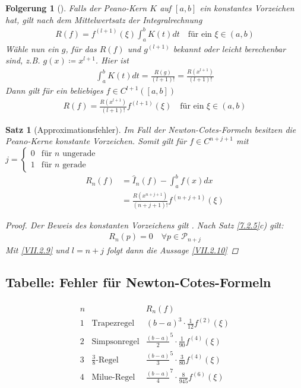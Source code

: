 \documentclass[ngerman,fontsize=11pt, paper=a4, parskip=half, titlepage=true, toc=bib]{scrbook}
\theoremstyle{definition}
\theoremstyle{plain}
\newtheorem{Satz}[Def]{Satz}		%
\newtheorem{Fol}[Def]{Folgerung}
\newcommand{\subsectione}[1]{\addtocounter{Def}{1}\subsection{#1}}
\newenvironment{Satze}[1][]{ %
  \begin{Satz}[#1]  }
  { \end{Satz}
  \addtocounter{subsection}{1}}
\newenvironment{Fole}[1][]{ %
  \begin{Fol}[#1]}
  {\end{Fol}
  \addtocounter{subsection}{1}}
\begin{document}
\begin{Fole}\label{7.2.7}
  Falls der Peano-Kern $K$ auf $[a,b]$ ein konstantes Vorzeichen hat,
gilt nach dem Mittelwertsatz der Integralrechnung
\begin{gather}
  R(f) = f^{(l+1)}(\xi) \int_a^b K(t)dt 
  \quad \text{für ein }\xi\in (a,b)
  \label{VII.2.8}
\end{gather}
Wähle nun ein $g$, für das $R(f)$ und $g^{(l+1)}$ bekannt oder leicht
berechenbar sind, z.B.
$g(x)\coloneqq x^{l+1}$. Hier ist
\begin{gather*}
  \int_a^bK(t)dt = \frac{R(g)}{(l+1)!} = \frac{R(x^{l+1})}{(l+1)!}
\end{gather*}
Dann gilt für ein beliebiges $f\in C^{l+1}([a,b])$
\begin{gather}
  R(f) = \frac{R(x^{l+1})}{(l+1)!} f^{(l+1)}(\xi)
  \quad \text{für ein }\xi \in (a,b)
\label{VII.2.9}
\end{gather}
\end{Fole}

\begin{Satze}[Approximationsfehler]
  Im Fall der Newton-Cotes-Formeln besitzen die Peano-Kerne
konstante Vorzeichen. Somit gilt für $f\in C^{n+j+1}$ mit 
  $j= \begin{cases}
    0 & \text{für $n$ ungerade}\\
    1 & \text{für $n$ gerade}
    \end{cases}$
\begin{align}\nonumber
  R_n(f) &= \hat{I}_n (f) - \int_a^b f(x) dx\\
         &= \frac{R(x^{n+j+1})}{(n+j+1)!}f^{(n+j+1)}(\xi)
           \label{VII.2.10}
\end{align}

\begin{proof}
  Der Beweis des konstanten Vorzeichens gilt
  \cite[siehe][]{steffensen}.
  Nach Satz \ref{7.2.5}c) gilt:
\begin{gather*}
  R_n(p) = 0 \quad\forall p\in\mathcal{P}_{n+j}
\end{gather*}
Mit \eqref{VII.2.9} und $l=n+j$ folgt dann die Aussage \eqref{VII.2.10}
\end{proof}
\end{Satze}


\subsectione{Tabelle: Fehler für Newton-Cotes-Formeln}
\begin{gather*}\label{7.2.9}
  \begin{array}{cll}
    n & & R_n(f)\\
    1 &\text{Trapezregel} &(b-a)^3\cdot\frac{1}{12}f^{(2)}(\xi)\\
    2 &\text{Simpsonregel}&\frac{(b-a)}{2}^5\cdot\frac{1}{90}f^{(4)}(\xi)\\
    3 &\text{$\frac{3}{8}$-Regel}&\frac{(b-a)}{3}^5\cdot\frac{3}{80}f^{(4)}(\xi)\\
    4 &\text{Milue-Regel}
        &\frac{(b-a)}{4}^7\cdot\frac{8}{945}f^{(6)}(\xi)\\
  \end{array}
\end{gather*}
\end{document}
